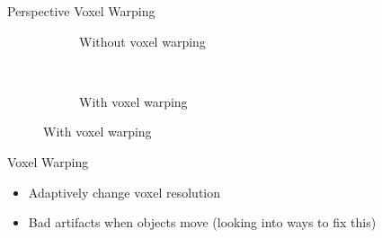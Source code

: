 \documentclass[10pt]{beamer}
\begin{document}
\begin{frame}{Perspective Voxel Warping}
  \begin{figure}
    \begin{subfigure}[t]{0.475\textwidth}
      \caption*{Without voxel warping}
    \end{subfigure}
    ~
    \begin{subfigure}[t]{0.475\textwidth}
      \caption*{With voxel warping}
    \end{subfigure}
  \end{figure}
\end{frame}

\begin{frame}{Voxel Warping}
  \begin{itemize}
    \item Adaptively change voxel resolution
    \item Bad artifacts when objects move (looking into ways to fix this) %
  \end{itemize}
\end{frame}

\end{document}
